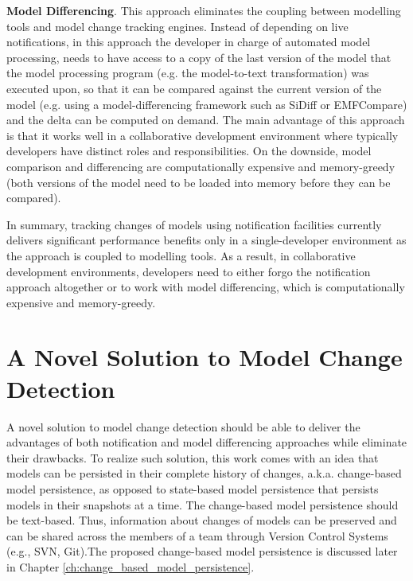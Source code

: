 \textbf{Model Differencing}. This approach eliminates the coupling between 
modelling tools and model change tracking engines. Instead of depending on 
live notifications, in this approach the developer in charge of automated model 
processing, needs to have access to a copy of the last version of the model that the model processing program (e.g. the model-to-text transformation) was 
executed upon, so that it can be compared against the current version of 
the model (e.g. using a model-differencing framework such as SiDiff or 
EMFCompare) and the delta can be computed on demand. The main advantage of 
this approach is that it works well in a collaborative development environment 
where typically developers have distinct roles and responsibilities. On the 
downside, model comparison and differencing are computationally expensive and 
memory-greedy (both versions of the model need to be loaded into memory before 
they can be compared).

In summary, tracking changes of models using notification facilities currently delivers significant performance benefits only in a single-developer environment as the approach is coupled to modelling tools. 
As a result, in collaborative development environments, 
developers need to either forgo the notification approach altogether 
or to work with model differencing, which is computationally expensive and 
memory-greedy.

\section{A Novel Solution to Model Change Detection}
\label{sec:a_novel_solution_to_model_change_detection}
A novel solution to model change detection should be able to deliver the advantages of both notification and model differencing approaches while eliminate their drawbacks. To realize such solution, this work comes with an idea that models can be persisted in their complete history of changes, a.k.a. change-based model persistence, as opposed to state-based model persistence that persists models in their snapshots at a time. The change-based model persistence should be text-based. Thus, information about changes of models can be preserved and can be shared across the members of a team through Version Control Systems (e.g., SVN, Git).The proposed change-based model persistence is discussed later in Chapter \ref{ch:change_based_model_persistence}. 

